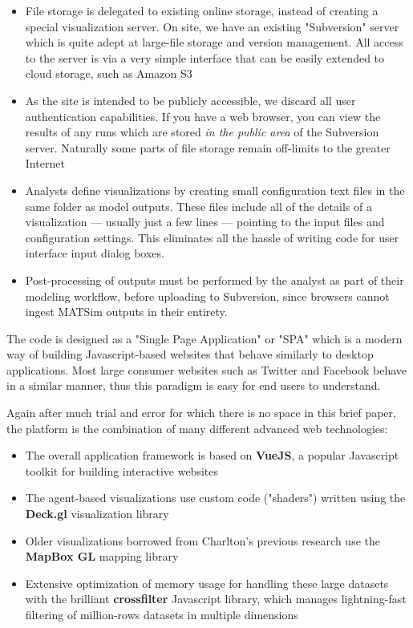 \documentclass[3p,times,procedia]{elsarticle}
\begin{document}
\begin{itemize}
  \item File storage is delegated to existing online storage, instead of creating a special visualization server. On site, we have an existing "Subversion" server \cite{Collins-SussmanEtc2008SubversionBook} which is quite adept at large-file storage and version management. All access to the server is via a very simple interface that can be easily extended to cloud storage, such as Amazon S3
  \item As the site is intended to be publicly accessible, we discard all user authentication capabilities. If you have a web browser, you can view the results of any runs which are stored \emph{in the public area} of the Subversion server. Naturally some parts of file storage remain off-limits to the greater Internet
  \item Analysts define visualizations by creating small configuration text files in the same folder as model outputs. These files include all of the details of a visualization --- usually just a few lines --- pointing to the input files and configuration settings. This eliminates all the hassle of writing code for user interface input dialog boxes.
  \item Post-processing of outputs must be performed by the analyst as part of their modeling workflow, before uploading to Subversion, since browsers cannot ingest MATSim outputs in their entirety.
\end{itemize}

The code is designed as a "Single Page Application" or "SPA" which is a modern way of building Javascript-based websites that behave similarly to desktop applications. Most large consumer websites such as Twitter and Facebook behave in a similar manner, thus this paradigm is easy for end users to understand.

Again after much trial and error for which there is no space in this brief paper, the platform is the combination of many different advanced web technologies:

\begin{itemize}
  \item The overall application framework is based on \textbf{VueJS}, a popular Javascript toolkit for building interactive websites
  \item The agent-based visualizations use custom code ("shaders") written using the \textbf{Deck.gl} visualization library
  \item Older visualizations borrowed from Charlton's previous research use the \textbf{MapBox GL} mapping library
  \item Extensive optimization of memory usage for handling these large datasets with the brilliant \textbf{crossfilter} Javascript library, which manages lightning-fast filtering of million-rows datasets in multiple dimensions
\end{itemize}
\end{document}
